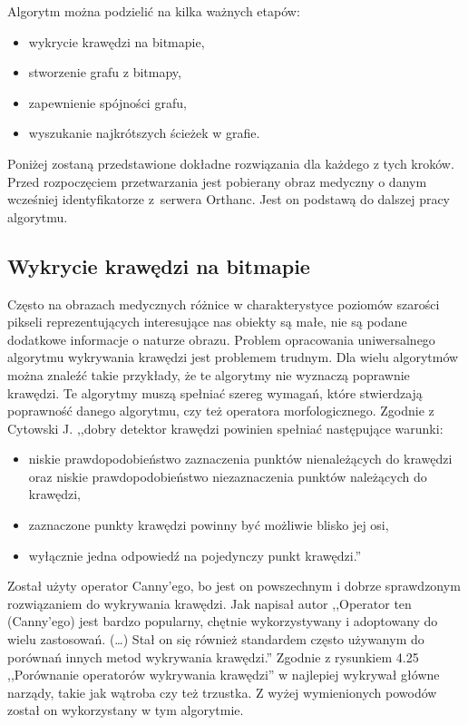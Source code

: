 \documentclass[a4paper,11pt,twoside,openright]{report}
\theoremstyle{definition}
\begin{document}
Algorytm można podzielić na kilka ważnych etapów:

\begin{itemize}[noitemsep]
\item {wykrycie krawędzi na bitmapie,}
\item {stworzenie grafu z bitmapy,}
\item {zapewnienie spójności grafu,}
\item {wyszukanie najkrótszych ścieżek w grafie.}
\end{itemize}

Poniżej zostaną przedstawione dokładne rozwiązania dla każdego z tych kroków. Przed rozpoczęciem przetwarzania jest pobierany obraz medyczny o danym wcześniej identyfikatorze z~serwera Orthanc. Jest on podstawą do dalszej pracy algorytmu.


\subsection {Wykrycie krawędzi na bitmapie}

Często na obrazach medycznych różnice w charakterystyce poziomów szarości pikseli reprezentujących interesujące nas obiekty są małe, nie są podane dodatkowe informacje o naturze obrazu. Problem opracowania uniwersalnego algorytmu wykrywania krawędzi jest problemem trudnym. Dla wielu algorytmów można znaleźć takie przykłady, że te algorytmy nie wyznaczą poprawnie krawędzi. Te algorytmy muszą spełniać szereg wymagań, które stwierdzają poprawność danego algorytmu, czy też operatora morfologicznego. Zgodnie z Cytowski J. \cite{Cyfrowe przetwarzanie obrazów medycznych} ,,dobry detektor krawędzi powinien spełniać następujące warunki:
\begin{itemize}[noitemsep]
\item {niskie prawdopodobieństwo zaznaczenia punktów nienależących do krawędzi oraz niskie prawdopodobieństwo niezaznaczenia punktów należących do krawędzi,}
\item {zaznaczone punkty krawędzi powinny być możliwie blisko jej osi,}
\item {wyłącznie jedna odpowiedź na pojedynczy punkt krawędzi.''}
\end{itemize}

Został użyty operator Canny'ego, bo jest on powszechnym i dobrze sprawdzonym rozwiązaniem do wykrywania krawędzi. Jak napisał autor \cite{Cyfrowe przetwarzanie obrazów medycznych} ,,Operator ten (Canny'ego) jest bardzo popularny, chętnie wykorzystywany i adoptowany do wielu zastosowań. (\dots) Stał on się również standardem często używanym do porównań innych metod wykrywania krawędzi.'' Zgodnie z rysunkiem 4.25 ,,Porównanie operatorów wykrywania krawędzi'' w \cite{Cyfrowe przetwarzanie obrazów medycznych} najlepiej wykrywał główne narządy, takie jak wątroba czy też trzustka. Z wyżej wymienionych powodów został on wykorzystany w tym algorytmie.
\end{document}
